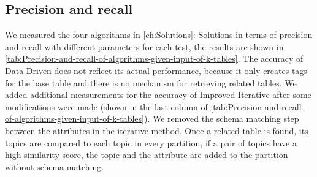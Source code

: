 \subsection{Precision and recall}

We measured the four algorithms in \autoref{ch:Solutions}: Solutions in terms of precision and recall with different parameters for each test, the results are shown in \autoref{tab:Precision-and-recall-of-algorithms-given-input-of-k-tables}. The accuracy of Data Driven does not reflect its actual performance, because it only creates tags for the base table and there is no mechanism for retrieving related tables. We added additional measurements for the accuracy of Improved Iterative after some modifications were made (shown in the last column of \autoref{tab:Precision-and-recall-of-algorithms-given-input-of-k-tables}). We removed the schema matching step between the attributes in the iterative method. Once a related table is found, its topics are compared to each topic in every partition, if a pair of topics have a high similarity score, the topic and the attribute are added to the partition without schema matching.

